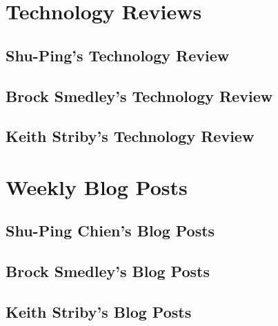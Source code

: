 \documentclass[letterpaper,10pt,serif,draftclsnofoot,onecolumn,compsoc,titlepage]{IEEEtran}
\begin{document}
\newpage

\section{Technology Reviews}

	\subsection{Shu-Ping's Technology Review}

		

	\newpage

	\subsection{Brock Smedley's Technology Review}

		

	\newpage

	\subsection{Keith Striby's Technology Review}

		

	\newpage

\section{Weekly Blog Posts}
	\subsection{Shu-Ping Chien's Blog Posts}

		

	\newpage

	\subsection{Brock Smedley's Blog Posts}

		

	\newpage
	
	\subsection{Keith Striby's Blog Posts}

		
\end{document}
